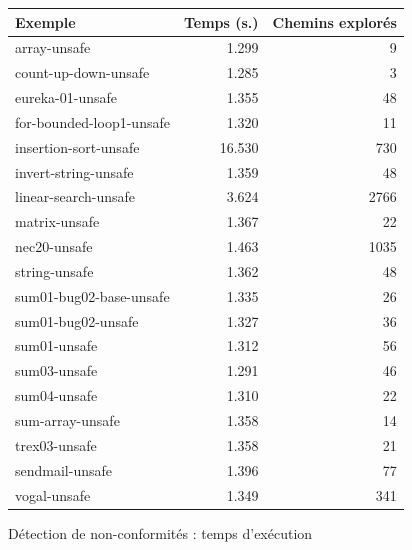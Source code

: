 \begin{figure}[tb]\scriptsize
  \begin{center}
    \begin{tabular}{lrr}
      \hline
      Exemple & Temps (s.) & Chemins explorés \\ \hline
      array-unsafe & 1.299 & 9 \\ \hline
      count-up-down-unsafe & 1.285 & 3 \\ \hline
      eureka-01-unsafe & 1.355 & 48 \\ \hline
      for-bounded-loop1-unsafe & 1.320 & 11 \\ \hline
      insertion-sort-unsafe & 16.530 & 730 \\ \hline
      invert-string-unsafe & 1.359 & 48 \\ \hline
      linear-search-unsafe & 3.624 & 2766 \\ \hline
      matrix-unsafe & 1.367 & 22 \\ \hline
      nec20-unsafe & 1.463 & 1035 \\ \hline
      string-unsafe & 1.362 & 48 \\ \hline
      sum01-bug02-base-unsafe & 1.335 & 26 \\ \hline
      sum01-bug02-unsafe & 1.327 & 36 \\ \hline
      sum01-unsafe & 1.312 & 56 \\ \hline
      sum03-unsafe & 1.291 & 46 \\ \hline
      sum04-unsafe & 1.310 & 22 \\ \hline
      sum-array-unsafe & 1.358 & 14 \\ \hline
      trex03-unsafe & 1.358 & 21 \\ \hline
      sendmail-unsafe & 1.396 & 77 \\ \hline
      vogal-unsafe & 1.349 & 341 \\ \hline
    \end{tabular}
  \end{center}
  \vspace{-3mm}
  \caption{Détection de non-conformités : temps d'exécution}    
  \label{fig:scam-experiments1}
\end{figure}

